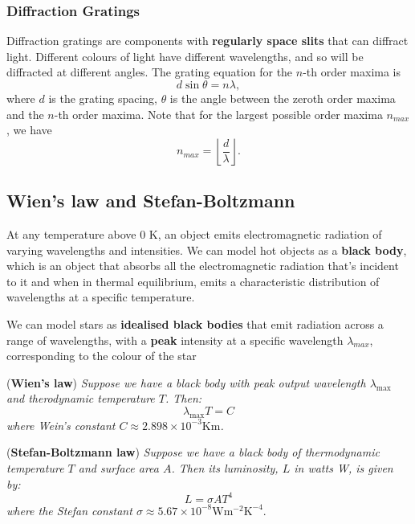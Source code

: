\subsubsection*{Diffraction Gratings}

Diffraction gratings are components with \textbf{regularly space slits} that can diffract light. Different colours of light have different wavelengths, and so will be diffracted at different angles. The grating equation for the $n$-th order maxima is 
\begin{equation}
    d \sin \theta = n \lambda,
\end{equation}
where $d$ is the grating spacing, $\theta$ is the angle between the zeroth order maxima and the $n$-th order maxima. Note that for the largest possible order maxima $n_{max}$, we have
\begin{equation}
    n_{max} = \left\lfloor \frac{d}{\lambda} \right\rfloor.
\end{equation}

\subsection{Wien's law and Stefan-Boltzmann} 

At any temperature above $0$ K, an object emits electromagnetic radiation of varying wavelengths and intensities. We can model hot objects as a \textbf{black body}, which is an object that absorbs all the electromagnetic radiation that's incident to it and when in thermal equilibrium, emits a characteristic distribution of wavelengths at a specific temperature. 

We can model stars as \textbf{idealised black bodies} that emit radiation across a range of wavelengths, with a \textbf{peak} intensity at a specific wavelength $\lambda_{max}$, corresponding to the colour of the star

\begin{theorem}{(\textbf{Wien's law})}
\textit{Suppose we have a black body with peak output wavelength \(\lambda_{\textrm{max}}\) and therodynamic temperature \(T\). Then: }
\begin{equation}
\lambda_{\textrm{max}} T = C
\end{equation} 
\textit{where Wein's constant \(C \approx 2.898 \times 10^{-3} \textrm{Km}\).}
\end{theorem} 

\begin{theorem}{(\textbf{Stefan-Boltzmann law})}
\textit{Suppose we have a black body of thermodynamic temperature \(T\) and surface area \(A\). Then its luminosity, \(L\) in watts W, is given by: }
\begin{equation} 
L = \sigma A T^4
\end{equation} 
\textit{where the Stefan constant \(\sigma \approx 5.67 \times 10^{-8} \textrm{W} \textrm{m}^{-2} \textrm{K}^{-4}\)}. 
\end{theorem} 

